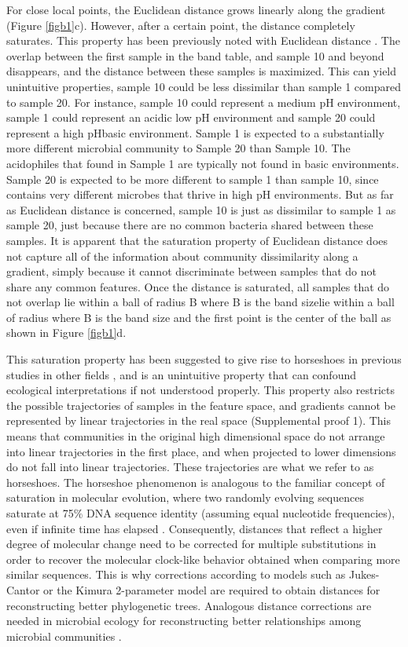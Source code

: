 For close local points, the Euclidean distance grows linearly along the gradient (Figure \ref{figb1}c).  However, after a certain point, the distance completely saturates. This property has been previously noted with Euclidean distance \cite{detrended_correspondence_analysis}.  The overlap between the first sample in the band table, and sample 10 and beyond disappears, and the distance between these samples is maximized. This can yield unintuitive properties, sample 10 could be less dissimilar than sample 1 compared to sample 20.  For instance, sample 10 could represent a medium pH environment, sample 1 could represent an acidic low pH environment and sample 20 could represent a high pHbasic environment. Sample 1 is expected to a substantially more different microbial community to Sample 20 than Sample 10.  The acidophiles that found in Sample 1 are typically not found in basic environments. Sample 20 is expected to be more different to sample 1 than sample 10, since contains very different microbes that thrive in high pH environments.  But as far as Euclidean distance is concerned, sample 10 is just as dissimilar to sample 1 as sample 20, just because there are no common bacteria shared between these samples.  It is apparent that the saturation property of Euclidean distance does not capture all of the information about community dissimilarity along a gradient, simply because it cannot discriminate between samples that do not share any common features.  Once the distance is saturated, all samples that do not overlap lie within a ball of radius B where B is the band sizelie within a ball of radius where B is the band size and the first point is the center of the ball as shown in Figure \ref{figb1}d.\par
This saturation property has been suggested to give rise to horseshoes in previous studies in other fields \cite{horseshoe_kernel}, and is an unintuitive property that can confound ecological interpretations if not understood properly.  This property also restricts the possible trajectories of samples in the feature space, and gradients cannot be represented by linear trajectories in the real space (Supplemental proof 1). This means that communities in the original high dimensional space do not arrange into linear trajectories in the first place, and when projected to lower dimensions do not fall into linear trajectories.  These trajectories are what we refer to as horseshoes.  The horseshoe phenomenon is analogous to the familiar concept of saturation in molecular evolution, where two randomly evolving sequences saturate at 75\% DNA sequence identity (assuming equal nucleotide frequencies), even if infinite time has elapsed \cite{dna_saturation}. Consequently, distances that reflect a higher degree of molecular change need to be corrected for multiple substitutions in order to recover the molecular clock-like behavior obtained when comparing more similar sequences. This is why corrections according to models such as Jukes-Cantor or the Kimura 2-parameter model are required to obtain distances for reconstructing better phylogenetic trees. Analogous distance corrections are needed in microbial ecology for reconstructing better relationships among microbial communities \cite{evolutionary_distances}.\par
